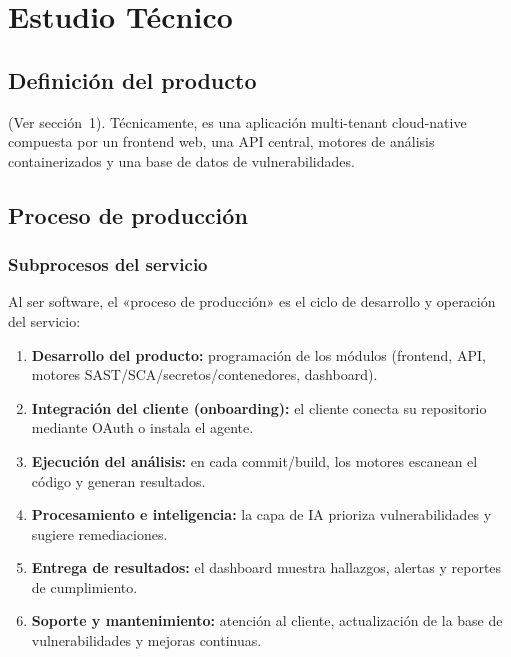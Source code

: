 \section{Estudio Técnico}

\subsection{Definición del producto}
(Ver sección~1). Técnicamente, \NombreProducto{} es una aplicación multi-tenant
cloud-native compuesta por un frontend web, una API central, motores de análisis
containerizados y una base de datos de vulnerabilidades.

\subsection{Proceso de producción}

\subsubsection{Subprocesos del servicio}
Al ser software, el «proceso de producción» es el ciclo de desarrollo y operación del
servicio:

\begin{enumerate}
  \item \textbf{Desarrollo del producto:} programación de los módulos (frontend, API,
        motores SAST/SCA/secretos/contenedores, dashboard).
  \item \textbf{Integración del cliente (onboarding):} el cliente conecta su repositorio
        mediante OAuth o instala el agente.
  \item \textbf{Ejecución del análisis:} en cada commit/build, los motores escanean el
        código y generan resultados.
  \item \textbf{Procesamiento e inteligencia:} la capa de IA prioriza vulnerabilidades
        y sugiere remediaciones.
  \item \textbf{Entrega de resultados:} el dashboard muestra hallazgos, alertas y
        reportes de cumplimiento.
  \item \textbf{Soporte y mantenimiento:} atención al cliente, actualización de la base
        de vulnerabilidades y mejoras continuas.
\end{enumerate}

